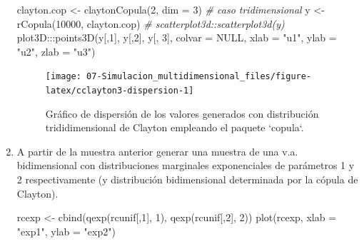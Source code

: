 \documentclass[
]{book}
\newenvironment{Shaded}{\begin{snugshade}}{\end{snugshade}}
\newcommand{\AttributeTok}[1]{\textcolor[rgb]{0.77,0.63,0.00}{#1}}
\newcommand{\CommentTok}[1]{\textcolor[rgb]{0.56,0.35,0.01}{\textit{#1}}}
\newcommand{\ConstantTok}[1]{\textcolor[rgb]{0.00,0.00,0.00}{#1}}
\newcommand{\DecValTok}[1]{\textcolor[rgb]{0.00,0.00,0.81}{#1}}
\newcommand{\FunctionTok}[1]{\textcolor[rgb]{0.00,0.00,0.00}{#1}}
\newcommand{\NormalTok}[1]{#1}
\newcommand{\OtherTok}[1]{\textcolor[rgb]{0.56,0.35,0.01}{#1}}
\newcommand{\SpecialCharTok}[1]{\textcolor[rgb]{0.00,0.00,0.00}{#1}}
\newcommand{\StringTok}[1]{\textcolor[rgb]{0.31,0.60,0.02}{#1}}
\theoremstyle{break}
\theoremstyle{definition}
\theoremstyle{definition}
\theoremstyle{definition}
\theoremstyle{definition}
\theoremstyle{remark}
\begin{document}
\begin{enumerate}
\begin{Shaded}
\begin{Highlighting}[]
\NormalTok{clayton.cop }\OtherTok{\textless{}{-}} \FunctionTok{claytonCopula}\NormalTok{(}\DecValTok{2}\NormalTok{, }\AttributeTok{dim =} \DecValTok{3}\NormalTok{) }\CommentTok{\# caso tridimensional}
\NormalTok{y }\OtherTok{\textless{}{-}} \FunctionTok{rCopula}\NormalTok{(}\DecValTok{10000}\NormalTok{, clayton.cop)}
\CommentTok{\# scatterplot3d::scatterplot3d(y)}
\NormalTok{plot3D}\SpecialCharTok{:::}\FunctionTok{points3D}\NormalTok{(y[,}\DecValTok{1}\NormalTok{], y[,}\DecValTok{2}\NormalTok{], y[, }\DecValTok{3}\NormalTok{], }\AttributeTok{colvar =} \ConstantTok{NULL}\NormalTok{, }
                  \AttributeTok{xlab =} \StringTok{"u1"}\NormalTok{, }\AttributeTok{ylab =} \StringTok{"u2"}\NormalTok{, }\AttributeTok{zlab =} \StringTok{"u3"}\NormalTok{) }
\end{Highlighting}
\end{Shaded}

  \begin{figure}[!htb]

  {\centering \texttt{[image: 07-Simulacion\_multidimensional\_files/figure-latex/cclayton3-dispersion-1]} 

  }

  \caption{Gráfico de dispersión de los valores generados con distribución trididimensional de Clayton empleando el paquete `copula`.}\label{fig:cclayton3-dispersion}
  \end{figure}
\item
  A partir de la muestra anterior generar una muestra de una v.a.
  bidimensional con distribuciones marginales exponenciales de
  parámetros 1 y 2 respectivamente (y distribución bidimensional
  determinada por la cópula de Clayton).

\begin{Shaded}
\begin{Highlighting}[]
\NormalTok{rcexp }\OtherTok{\textless{}{-}} \FunctionTok{cbind}\NormalTok{(}\FunctionTok{qexp}\NormalTok{(rcunif[,}\DecValTok{1}\NormalTok{], }\DecValTok{1}\NormalTok{), }\FunctionTok{qexp}\NormalTok{(rcunif[,}\DecValTok{2}\NormalTok{], }\DecValTok{2}\NormalTok{))}
\FunctionTok{plot}\NormalTok{(rcexp, }\AttributeTok{xlab =} \StringTok{"exp1"}\NormalTok{, }\AttributeTok{ylab =} \StringTok{"exp2"}\NormalTok{)  }
\end{Highlighting}
\end{Shaded}

  \begin{figure}[!htb]


\end{figure}
\end{enumerate}
\end{document}
